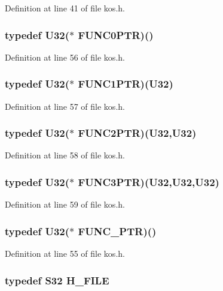 Definition at line 41 of file kos.h.
\subsubsection{\setlength{\rightskip}{0pt plus 5cm}typedef {\bf U32}($\ast$ FUNC0PTR)()}\label{kos_8h_a54}




Definition at line 56 of file kos.h.
\subsubsection{\setlength{\rightskip}{0pt plus 5cm}typedef {\bf U32}($\ast$ FUNC1PTR)({\bf U32})}\label{kos_8h_a55}




Definition at line 57 of file kos.h.
\subsubsection{\setlength{\rightskip}{0pt plus 5cm}typedef {\bf U32}($\ast$ FUNC2PTR)({\bf U32},{\bf U32})}\label{kos_8h_a56}




Definition at line 58 of file kos.h.
\subsubsection{\setlength{\rightskip}{0pt plus 5cm}typedef {\bf U32}($\ast$ FUNC3PTR)({\bf U32},{\bf U32},{\bf U32})}\label{kos_8h_a57}




Definition at line 59 of file kos.h.
\subsubsection{\setlength{\rightskip}{0pt plus 5cm}typedef {\bf U32}($\ast$ FUNC\_\-PTR)()}\label{kos_8h_a53}




Definition at line 55 of file kos.h.
\subsubsection{\setlength{\rightskip}{0pt plus 5cm}typedef {\bf S32} H\_\-FILE}\label{kos_8h_a58}




